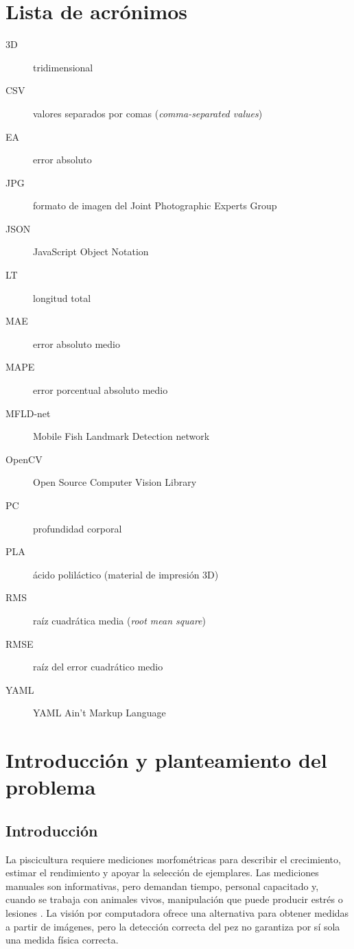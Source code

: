 \documentclass{report}
\begin{document}
\chapter*{Lista de acrónimos}
\begin{description}
\item[3D] tridimensional
\item[CSV] valores separados por comas (\emph{comma-separated values})
\item[EA] error absoluto
\item[JPG] formato de imagen del Joint Photographic Experts Group
\item[JSON] JavaScript Object Notation
\item[LT] longitud total
\item[MAE] error absoluto medio
\item[MAPE] error porcentual absoluto medio
\item[MFLD-net] Mobile Fish Landmark Detection network
\item[OpenCV] Open Source Computer Vision Library
\item[PC] profundidad corporal
\item[PLA] ácido poliláctico (material de impresión 3D)
\item[RMS] raíz cuadrática media (\emph{root mean square})
\item[RMSE] raíz del error cuadrático medio
\item[YAML] YAML Ain't Markup Language
\end{description}
\chapter{Introducción y planteamiento del problema}

\section{Introducción}

La piscicultura requiere mediciones morfométricas para describir el crecimiento, estimar el rendimiento y apoyar la selección de ejemplares. Las mediciones manuales son informativas, pero demandan tiempo, personal capacitado y, cuando se trabaja con animales vivos, manipulación que puede producir estrés o lesiones \parencite{Fernandes2020,Saleh2023,Torres2018}. La visión por computadora ofrece una alternativa para obtener medidas a partir de imágenes, pero la detección correcta del pez no garantiza por sí sola una medida física correcta.
\end{document}
